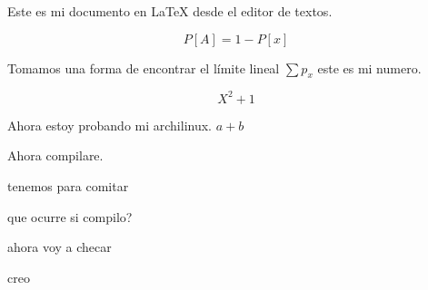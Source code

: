 \documentclass{article}
\begin{document}
Este es mi documento en \LaTeX{} desde el editor de textos. 

\begin{displaymath} 
 P[A] = 1 - P[x] 
\end{displaymath} 

 Tomamos una forma de encontrar el límite lineal
 $ \sum p_x $  este es mi numero.
 
 \begin{displaymath}
    X^2 + 1
 \end{displaymath}
 
 Ahora estoy probando mi archilinux. \(a +b \) 
 
 Ahora compilare. 
 
 
 tenemos para comitar
 
 
 que ocurre si compilo?
 
 ahora voy a checar
 
 creo
\end{document}
